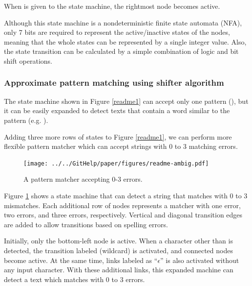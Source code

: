 \documentclass[manuscript,screen,review]{acmart}
\begin{document}
When  is given to the state machine,
the rightmost node becomes active.
%

Although this state machine is a nondeterministic finite state automata (NFA),
only 7 bits are required to represent the active/inactive states of the nodes,
meaning that the whole states can be represented by a single integer value.
Also,
the state transition can be calculated by a simple combination of
logic and bit shift operations.

\subsubsection{Approximate pattern matching using shifter algorithm}

The state machine shown in Figure \ref{readme1} can accept only one pattern
(), but
it can be easily expanded to detect texts that contain a word
similar to the pattern (e.g. ).


Adding three more rows of states to Figure \ref{readme1}, we can perform more
flexible pattern matcher which can accept strings with
0 to 3 matching errors.

\begin{figure}[htb]
  \centerline{\texttt{[image: ../../GitHelp/paper/figures/readme-ambig.pdf]}}
  \caption{A pattern matcher accepting 0-3 errors.}
  \label{shifterambig}
\end{figure}

Figure \ref{shifterambig} shows a state machine that can detect a string
that matches  with 0 to 3 mismatches.
Each additional row of nodes represents a matcher with one error,
two errors, and three errors, respectively.
Vertical and diagonal transition edges are added to allow
transitions based on spelling errors.

Initially, only the bottom-left node is active.
When a character other than  is detected, 
the transition labeled \sqsf{*} (wildcard) is activated,
and connected nodes become active.
At the same time, links labeled as ``$\epsilon$''
is also activated without any input character.
With these additional links, this expanded machine can detect a text which
matches  with 0 to 3 errors.
\end{document}
